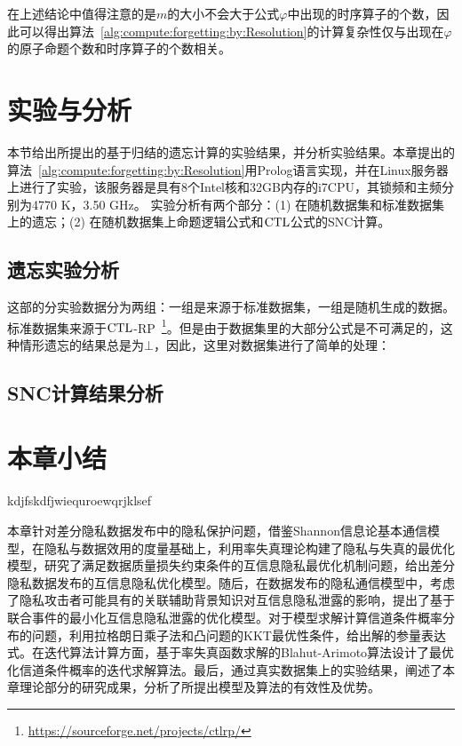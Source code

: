 在上述结论中值得注意的是$m$的大小不会大于公式$\varphi$中出现的时序算子的个数，因此可以得出算法~\ref{alg:compute:forgetting:by:Resolution}的计算复杂性仅与出现在$\varphi$的原子命题个数和时序算子的个数相关。

\section{实验与分析}
本节给出所提出的基于归结的遗忘计算的实验结果，并分析实验结果。本章提出的算法~\ref{alg:compute:forgetting:by:Resolution}用Prolog语言实现，并在Linux服务器上进行了实验，该服务器是具有8个Intel核和32GB内存的i7CPU，其锁频和主频分别为4770 K，3.50 GHz。
实验分析有两个部分：(1) 在随机数据集和标准数据集上的遗忘；(2) 在随机数据集上命题逻辑公式和$\textrm{CTL}$公式的SNC计算。

\subsection{遗忘实验分析}
这部的分实验数据分为两组：一组是来源于标准数据集，一组是随机生成的数据。
标准数据集来源于$\textrm{CTL}$-RP~\footnote{\url{https://sourceforge.net/projects/ctlrp/}}。但是由于数据集里的大部分公式是不可满足的，这种情形遗忘的结果总是为$\bot$，因此，这里对数据集进行了简单的处理：

\subsection{SNC计算结果分析}


\section{本章小结}\label{chapter04-conclusion}
kdjfskdfjwiequroewqrjklsef

本章针对差分隐私数据发布中的隐私保护问题，借鉴Shannon信息论基本通信模型，在隐私与数据效用的度量基础上，利用率失真理论构建了隐私与失真的最优化模型，研究了满足数据质量损失约束条件的互信息隐私最优化机制问题，给出差分隐私数据发布的互信息隐私优化模型。随后，在数据发布的隐私通信模型中，考虑了隐私攻击者可能具有的关联辅助背景知识对互信息隐私泄露的影响，提出了基于联合事件的最小化互信息隐私泄露的优化模型。对于模型求解计算信道条件概率分布的问题，利用拉格朗日乘子法和凸问题的KKT最优性条件，给出解的参量表达式。在迭代算法计算方面，基于率失真函数求解的Blahut-Arimoto算法设计了最优化信道条件概率的迭代求解算法。最后，通过真实数据集上的实验结果，阐述了本章理论部分的研究成果，分析了所提出模型及算法的有效性及优势。

